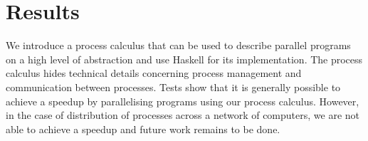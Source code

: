 \section{Results}
We introduce a process calculus that can be used to describe parallel programs on a high level of abstraction and use \textsf{Haskell} for its implementation. The process calculus hides technical details concerning process management and communication between processes. Tests show that it is generally possible to achieve a speedup by parallelising programs using our process calculus. However, in the case of distribution of processes across a network of computers, we are not able to achieve a speedup and future work remains to be done.